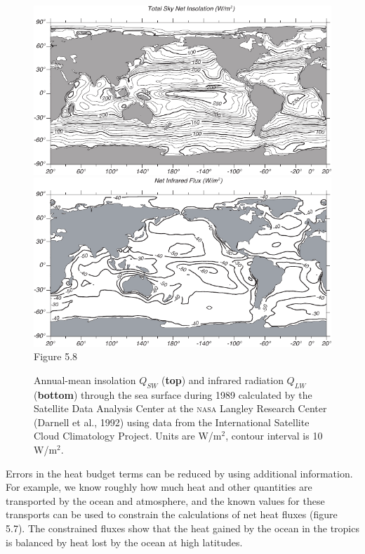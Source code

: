 \begin{figure}[t!]
\includegraphics{pics/globalsw}
\includegraphics{pics/globalLW}
\footnotesize
Figure 5.8 \rule{0mm}{3ex}Annual-mean
insolation $Q_{SW}$ (\textbf{top})
and infrared radiation $Q_{LW}$ (\textbf{bottom}) through the sea
surface during 1989 calculated by the Satellite Data Analysis Center
at the \textsc{nasa} Langley Research Center (Darnell et al., 1992)
using data from the International Satellite Cloud Climatology
Project. Units are W/m$^2$, contour interval is 10 W/m$^2$.
\label{fig:globalSW}
\vspace{-4ex}
\end{figure}

Errors in the heat budget terms can be reduced by using additional
information. For example, we know roughly how much heat and other
quantities are transported by the ocean and
atmosphere, and the known values for these transports can be used to
constrain the calculations of net heat fluxes
(figure 5.7). The constrained fluxes show that the heat gained by the
ocean in the tropics is balanced by heat lost by the ocean at high
latitudes.

